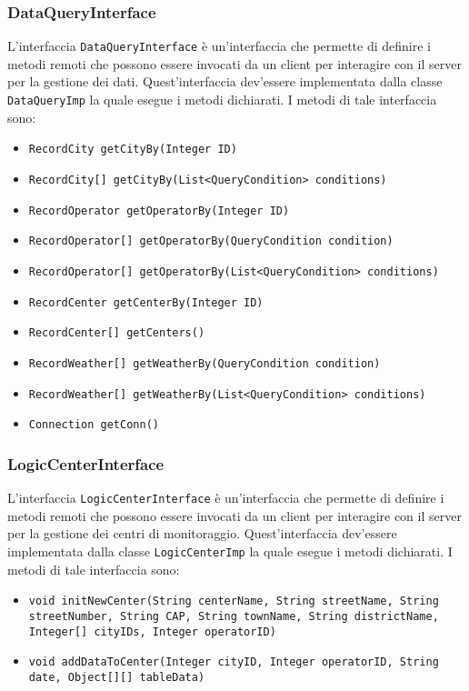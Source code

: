\subsubsection{DataQueryInterface}
L'interfaccia \texttt{DataQueryInterface} è un'interfaccia che permette di definire i metodi remoti che possono
essere invocati da un client per interagire con il server per la gestione dei dati.
Quest'interfaccia dev'essere implementata dalla classe \texttt{DataQueryImp} la quale esegue i metodi dichiarati.
I metodi di tale interfaccia sono:
\begin{itemize}
    \item \texttt{RecordCity getCityBy(Integer ID)}
    \item \texttt{RecordCity[] getCityBy(List<QueryCondition> conditions)}
    \item \texttt{RecordOperator getOperatorBy(Integer ID)}
    \item \texttt{RecordOperator[] getOperatorBy(QueryCondition condition)}
    \item \texttt{RecordOperator[] getOperatorBy(List<QueryCondition> conditions)}
    \item \texttt{RecordCenter getCenterBy(Integer ID)}
    \item \texttt{RecordCenter[] getCenters()}
    \item \texttt{RecordWeather[] getWeatherBy(QueryCondition condition)}
    \item \texttt{RecordWeather[] getWeatherBy(List<QueryCondition> conditions)}
    \item \texttt{Connection getConn()}
\end{itemize}

\subsubsection{LogicCenterInterface}
L'interfaccia \texttt{LogicCenterInterface} è un'interfaccia che permette di definire i metodi remoti che possono
essere invocati da un client per interagire con il server per la gestione dei centri di monitoraggio.
Quest'interfaccia dev'essere implementata dalla classe \texttt{LogicCenterImp} la quale esegue i metodi dichiarati.
I metodi di tale interfaccia sono:
\begin{itemize}
    \item \texttt{void initNewCenter(String centerName, String streetName, String streetNumber, String CAP, String townName, String districtName, Integer[] cityIDs, Integer operatorID)}
    \item \texttt{void addDataToCenter(Integer cityID, Integer operatorID, String date, Object[][] tableData)}
\end{itemize}

